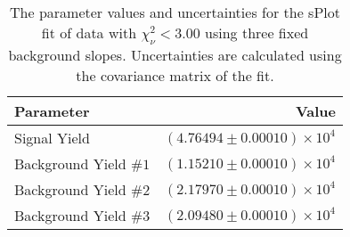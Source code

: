 
\begin{table}[ht]
    \begin{center}
        \begin{tabular}{lr}\toprule
            Parameter & Value \\\midrule
            Signal Yield & $(4.76494 \pm 0.00010) \times 10^{4}$ \\
            Background Yield $\#1$ & $(1.15210 \pm 0.00010) \times 10^{4}$ \\
            Background Yield $\#2$ & $(2.17970 \pm 0.00010) \times 10^{4}$ \\
            Background Yield $\#3$ & $(2.09480 \pm 0.00010) \times 10^{4}$ \\\bottomrule
        \end{tabular}
        \caption{The parameter values and uncertainties for the sPlot fit of data with $\chi^2_\nu < 3.00$ using three fixed background slopes. Uncertainties are calculated using the covariance matrix of the fit.}\label{tab:splot-fit-results-chisqdof-3.00-fixed-3}
    \end{center}
\end{table}
